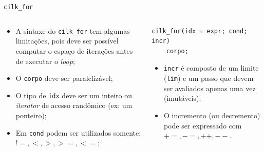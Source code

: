 \documentclass{beamer}
\begin{document}
\begin{frame}[fragile]{\texttt{cilk\_for}}
\begin{columns}[T]
\begin{column}{0.5\textwidth}
\begin{itemize}
    \item A sintaxe do \texttt{cilk\_for} tem algumas limitações, pois deve ser
    possível computar o espaço de iterações antes de executar o \textit{loop};
    \item O \texttt{corpo} deve ser paralelizável;
    \item O tipo de \texttt{idx} deve ser um inteiro ou \textit{iterator} de
    acesso randômico (ex: um ponteiro);
    \item Em \texttt{cond} podem ser utilizados somente: ${ !=, <, >, >=, <= }$;
\end{itemize}
\end{column}

\begin{column}{0.5\textwidth}
\begin{block}{}
\begin{lstlisting}
cilk_for(idx = expr; cond; incr)
    corpo;
\end{lstlisting}
\end{block}
\begin{itemize}
    \item \texttt{incr} é composto de um limite (\texttt{lim}) e um passo que
    devem ser avaliados apenas uma vez (imutáveis);
    \item O incremento (ou decremento) pode ser expressado com ${ +=, -=, ++,
    --}$.
\end{itemize}
\end{column}

\end{columns}
\end{frame}
\end{document}
